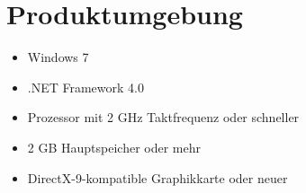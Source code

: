 \section{Produktumgebung}

\begin{itemize}
	\item Windows 7
	\item .NET Framework 4.0
	\item Prozessor mit 2 GHz Taktfrequenz oder schneller
	\item 2 GB Hauptspeicher oder mehr
	\item DirectX-9-kompatible Graphikkarte oder neuer
\end{itemize}
